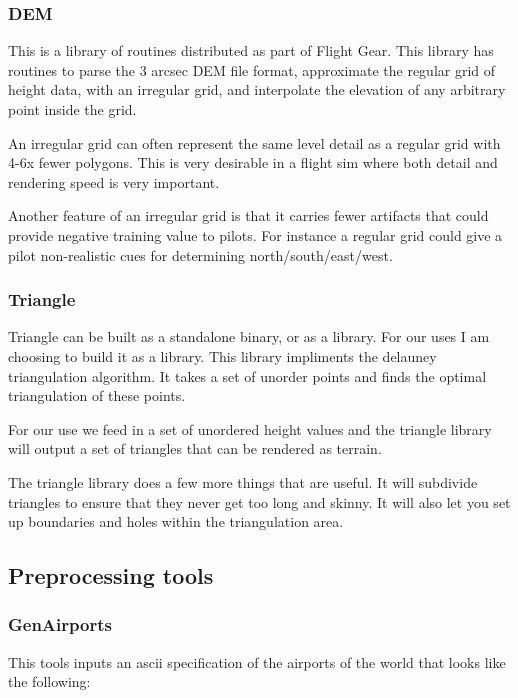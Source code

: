 \documentclass[12pt]{article}
\begin{document}
\subsubsection{DEM}

This is a library of routines distributed as part of Flight Gear.
This library has routines to parse the 3 arcsec DEM file format,
approximate the regular grid of height data, with an irregular grid,
and interpolate the elevation of any arbitrary point inside the grid.

An irregular grid can often represent the same level detail as a
regular grid with 4-6x fewer polygons.  This is very desirable in a
flight sim where both detail and rendering speed is very important.

Another feature of an irregular grid is that it carries fewer
artifacts that could provide negative training value to pilots.  For
instance a regular grid could give a pilot non-realistic cues for
determining north/south/east/west.


\subsubsection{Triangle}

Triangle can be built as a standalone binary, or as a library.  For
our uses I am choosing to build it as a library.  This library
impliments the delauney triangulation algorithm.  It takes a set of
unorder points and finds the optimal triangulation of these points.

For our use we feed in a set of unordered height values and the
triangle library will output a set of triangles that can be rendered
as terrain.

The triangle library does a few more things that are useful.  It will
subdivide triangles to ensure that they never get too long and
skinny.  It will also let you set up boundaries and holes within the
triangulation area.

\subsection{Preprocessing tools}

\subsubsection{GenAirports}

This tools inputs an ascii specification of the airports of the world
that looks like the following:
\end{document}
